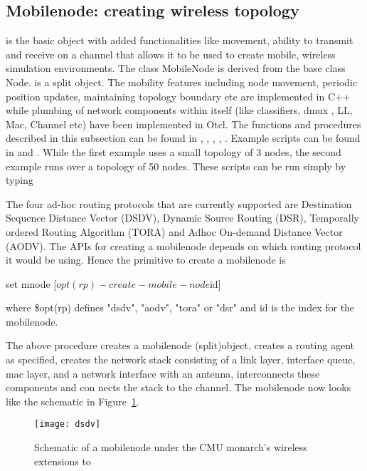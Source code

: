 \subsection{Mobilenode: creating wireless topology}
\label{sec:mobilenode-creation}

 is the basic \ns {} object with added
functionalities like movement, ability to transmit and receive on a
channel that allows it to be used to create mobile, wireless simulation
environments. The class MobileNode is derived from the base class Node.
 is a split object. The mobility features including node
movement, periodic position updates, maintaining topology boundary etc are
implemented in C++ while plumbing of network components within
 itself (like classifiers, dmux , LL, Mac, Channel etc)
have been implemented in Otcl. The functions and procedures described in
this subsection can be found in ,
, ,
, . Example scripts
can be found in
 and . While the
first example uses a small topology of 3 nodes, the second example runs
over a topology of 50 nodes. These scripts can be run simply by typing


The four ad-hoc routing protocols that are currently supported are 
Destination Sequence Distance Vector (DSDV), Dynamic Source Routing
(DSR), Temporally ordered Routing Algorithm (TORA) and Adhoc On-demand
Distance Vector (AODV). The APIs for creating a mobilenode depends on
which routing protocol it would be using. Hence the primitive to    
create a mobilenode is

\begin{program}
        set mnode [$opt(rp)-create-mobile-node $id] 
\end{program}
where \$opt(rp) defines "dsdv", "aodv", "tora" or "dsr" and id is the
index for the mobilenode.

The above procedure creates a mobilenode (split)object, creates a routing
agent as specified, creates the network stack consisting of a link layer,
interface queue, mac layer, and a network interface with an antenna,
interconnects these components and con   
nects the stack to the channel. The mobilenode now looks like the
schematic in Figure~\ref{fig:mobilenode-dsdv}.  
\begin{figure}
    \centerline{\texttt{[image: dsdv]}}
    \caption{Schematic of a mobilenode under the CMU monarch's
      wireless extensions to \ns} 
    \label{fig:mobilenode-dsdv} 
\end{figure}

